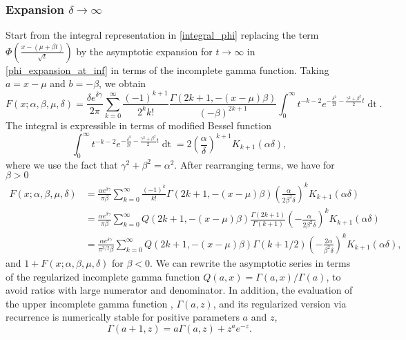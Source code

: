 \documentclass[10pt,a4paper,oneside]{article}
\numberwithin{equation}{section}
\begin{document}
\subsubsection{Expansion $\delta \to \infty$}
Start from the integral representation in \eqref{integral_phi} replacing the term $\Phi\left(\frac{x-(\mu + \beta t)}{\sqrt{t}}\right)$ by the asymptotic expansion for $t\to \infty$ in \eqref{phi_expansion_at_inf} in terms of the incomplete gamma function. Taking $a = x -\mu$ and $b = -\beta$, we obtain
\begin{equation}
F(x; \alpha, \beta, \mu, \delta) = \frac{\delta e^{\delta \gamma}}{2\pi} \sum_{k=0}^{\infty}\frac{(-1)^{k+1}}{2^k k!} \frac{\Gamma(2k+1, -(x-\mu)\beta)}{(-\beta)^{2k+1}} \int_0^{\infty} t^{-k-2} e^{-\frac{\delta^2}{2t} - \frac{\gamma^2 + \beta^2}{2}t} \mathop{dt}.
\end{equation}
The integral is expressible in terms of modified Bessel function
\begin{equation}
\int_0^{\infty} t^{-k-2} e^{-\frac{\delta^2}{2t} - \frac{\gamma^2 + \beta^2}{2}t} \mathop{dt} = 2 \left(\frac{\alpha}{\delta}\right)^{k + 1} K_{k+1}(\alpha \delta),
\end{equation}
where we use the fact that $\gamma^2+ \beta^2 = \alpha^2$. After rearranging terms, we have for $\beta > 0$
\begin{align}\label{general_asymptotic_delta}
F(x; \alpha, \beta, \mu, \delta) &= \frac{\alpha e^{\delta \gamma}}{\pi \beta}\sum_{k=0}^{\infty} \frac{(-1)^k}{k!} \Gamma(2k + 1, -(x-\mu)\beta)\left(\frac{\alpha}{2\beta^2 \delta}\right)^k K_{k+1}(\alpha \delta)\\
 &=\frac{\alpha e^{\delta \gamma}}{\pi \beta}\sum_{k=0}^{\infty} Q(2k + 1, -(x-\mu)\beta)\frac{\Gamma(2k+1)}{\Gamma(k+1)}\left(-\frac{\alpha}{2\beta^2 \delta}\right)^k K_{k+1}(\alpha \delta)\\
 &=\frac{\alpha e^{\delta \gamma}}{\pi^{3/2} \beta}\sum_{k=0}^{\infty} Q(2k + 1, -(x-\mu)\beta) \Gamma(k + 1/2)\left(-\frac{2\alpha}{\beta^2 \delta}\right)^k K_{k+1}(\alpha \delta),
\end{align}
and $1 + F(x; \alpha, \beta, \mu, \delta)$ for $\beta < 0$. We can rewrite the asymptotic series in terms of the regularized incomplete gamma function $Q(a, x) = \Gamma(a, x)/\Gamma(a)$, to avoid ratios with large numerator and denominator. In addition, the evaluation of the upper incomplete gamma function , $\Gamma(a, z)$, and its regularized version via recurrence is numerically stable for positive parameters $a$ and $z$,
\begin{equation}
\Gamma(a + 1, z) = a \Gamma(a, z) + z^a e^{-z}.
\end{equation}
\end{document}
